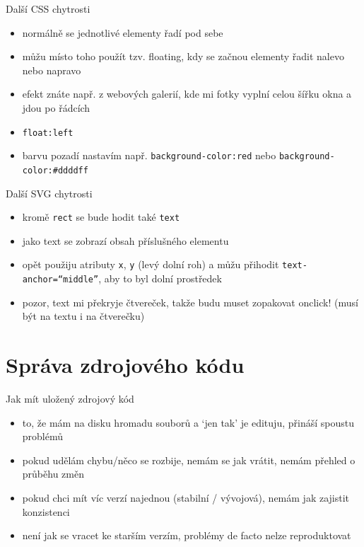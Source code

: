 \documentclass{beamer}
\begin{document}
\begin{frame}{Další CSS chytrosti}
  \begin{itemize}
    \item normálně se jednotlivé elementy řadí pod sebe
    \item můžu místo toho použít tzv. floating, kdy se začnou elementy řadit nalevo nebo napravo
    \item efekt znáte např. z webových galerií, kde mi fotky vyplní celou šířku okna a jdou po řádcích
    \item \texttt{float:left}
    \item barvu pozadí nastavím např. \texttt{background-color:red} nebo \texttt{background-color:\#ddddff}
  \end{itemize}
\end{frame}


\begin{frame}{Další SVG chytrosti}
  \begin{itemize}
    \item kromě \texttt{rect} se bude hodit také \texttt{text}
    \item jako text se zobrazí obsah příslušného elementu
    \item opět použiju atributy \texttt{x}, \texttt{y} (levý dolní roh) a můžu přihodit \texttt{text-anchor=``middle''}, aby to byl dolní prostředek
    \item pozor, text mi překryje čtvereček, takže budu muset zopakovat onclick! (musí být na textu i na čtverečku)
  \end{itemize}
\end{frame}

\section{Správa zdrojového kódu}

\begin{frame}{Jak mít uložený zdrojový kód}
  \begin{itemize}
    \item to, že mám na disku hromadu souborů a `jen tak' je edituju, přináší spoustu problémů
    \item pokud udělám chybu/něco se rozbije, nemám se jak vrátit, nemám přehled o průběhu změn
    \item pokud chci mít víc verzí najednou (stabilní / vývojová), nemám jak zajistit konzistenci
    \item není jak se vracet ke starším verzím, problémy de facto nelze reproduktovat
  \end{itemize}
\end{frame}
\end{document}
